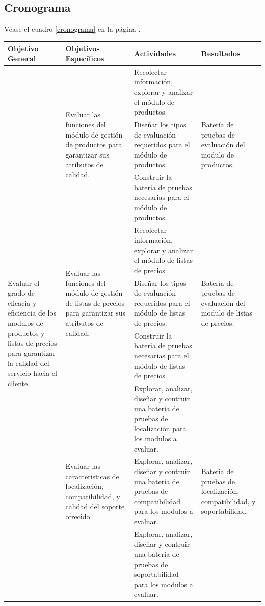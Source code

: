 \subsection{Cronograma}
Véase el cuadro \ref{cronograma} en la página \pageref{cronograma}.

\begin{table}
\centering
\small
\begin{tabular}{|l|l|p{6.5cm}|l|}
\hline
Objetivo General & Objetivos Específicos & Actividades & Resultados \\
\hline
\multirow{15}{4.0cm}{Evaluar el grado de eficacia y eficiencia de los modulos de productos y listas de precios para garantizar la calidad del servicio hacia el cliente.} &
\multirow{3}{4.0cm}{Evaluar las funciones del módulo de gestión de productos para garantizar sus atributos de calidad.} &
Recolectar información, explorar y analizar el módulo de productos. &
\multirow{3}{4.0cm}{Batería de pruebas de evaluación del modulo de productos.} \\
\cline{3-3}
& & Diseñar los tipos de evaluación requeridos para el módulo de productos. & \\
\cline{3-3}
& & Construir la batería de pruebas necesarias para el módulo de productos. & \\
\cline{2-4}
& \multirow{3}{4.0cm}{Evaluar las funciones del módulo de gestión de listas de precios para garantizar sus atributos de calidad.} &
Recolectar información, explorar y analizar el módulo de listas de precios. &
\multirow{3}{4.0cm}{Batería de pruebas de evaluación del modulo de listas de precios.} \\
\cline{3-3}
& & Diseñar los tipos de evaluación requeridos para el módulo de listas de precios. & \\
\cline{3-3}
& & Construir la batería de pruebas necesarias para el módulo de listas de precios. & \\
\cline{2-4}
& \multirow{3}{4.0cm}{Evaluar las caracteristicas de localización, compatibilidad, y calidad del soporte ofrecido.} &
Explorar, analizar, diseñar y contruir una batería de pruebas de localización para los modulos a evaluar. &
\multirow{3}{4.0cm}{Bateria de pruebas de localización, compatibilidad, y soportabilidad.} \\
\cline{3-3}
& & Explorar, analizar, diseñar y contruir una batería de pruebas de compatibilidad para los modulos a evaluar. & \\
\cline{3-3}
& & Explorar, analizar, diseñar y contruir una batería de pruebas de soportabilidad para los modulos a evaluar. & \\

\end{tabular}
\end{table}
